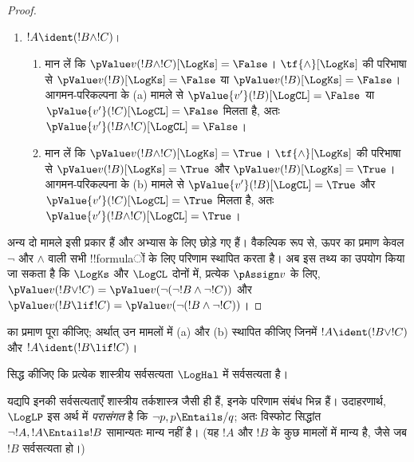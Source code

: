 \documentclass[../../../include/open-logic-section]{subfiles}
\begin{document}
\begin{proof}
\begin{enumerate}
    \item $!A \ident (!B \land !C)$।
    \begin{enumerate}
      \item मान लें कि $\pValue v(!B \land !C)[\LogKs] = \False$।
      $\tf{\land}[\LogKs]$ की परिभाषा से
      $\pValue v(!B)[\LogKs] = \False$ या
      $\pValue v(!B)[\LogKs] = \False$। आगमन-परिकल्पना के (a) मामले से
      $\pValue {v'}(!B)[\LogCL] = \False$ या
      $\pValue {v'}(!C)[\LogCL] = \False$ मिलता है, अतः
      $\pValue {v'}(!B \land !C)[\LogCL] = \False$।
      \item मान लें कि $\pValue v(!B \land !C)[\LogKs] = \True$।
      $\tf{\land}[\LogKs]$ की परिभाषा से
      $\pValue v(!B)[\LogKs] = \True$ और
      $\pValue v(!B)[\LogKs] = \True$। आगमन-परिकल्पना के (b) मामले से
      $\pValue {v'}(!B)[\LogCL] = \True$ और
      $\pValue {v'}(!C)[\LogCL] = \True$ मिलता है, अतः
      $\pValue {v'}(!B \land !C)[\LogCL] = \True$।
    \end{enumerate}
  \end{enumerate}

  अन्य दो मामले इसी प्रकार हैं और अभ्यास के लिए छोड़े गए हैं। वैकल्पिक रूप
  से, ऊपर का प्रमाण केवल $\lnot$ और $\land$ वाली सभी !!{formula}ों के लिए
  परिणाम स्थापित करता है। अब इस तथ्य का उपयोग किया जा सकता है कि $\LogKs$
  और $\LogCL$ दोनों में, प्रत्येक $\pAssign v$ के लिए,
  $\pValue v(!B \lor !C) = \pValue v(\lnot(\lnot!B \land \lnot !C))$
  और $\pValue v(!B \lif !C) =
  \pValue v(\lnot(!B \land \lnot !C))$।
\end{proof}

\begin{prob}
   का प्रमाण पूरा कीजिए; अर्थात् उन
  मामलों में (a) और (b) स्थापित कीजिए जिनमें
  $!A \ident (!B \lor !C)$ और $!A \ident (!B \lif !C)$।
\end{prob}

\begin{prob}
सिद्ध कीजिए कि प्रत्येक शास्त्रीय सर्वसत्यता $\LogHal$ में सर्वसत्यता है।
\end{prob}

यद्यपि इनकी सर्वसत्यताएँ शास्त्रीय तर्कशास्त्र जैसी ही हैं, इनके परिणाम
संबंध भिन्न हैं। उदाहरणार्थ, $\LogLP$ इस अर्थ में \emph{परासंगत} है कि
$\lnot p, p \Entails/ q$; अतः विस्फोट सिद्धांत
$\lnot !A, !A \Entails !B$ सामान्यतः मान्य नहीं है। (यह $!A$ और $!B$ के
कुछ मामलों में मान्य है, जैसे जब $!B$ सर्वसत्यता हो।)
\end{document}
